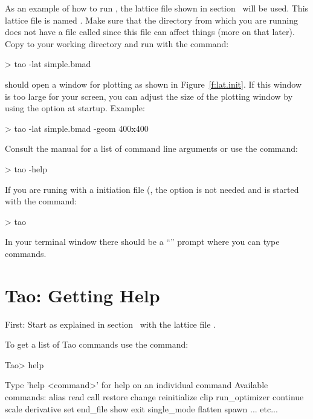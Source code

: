 \documentclass{hitec}
\newcommand{\Section}[1]{\section{#1}\vspace*{-1ex}}
\begin{document}
As an example of how to run \tao, the lattice file shown in section~ will be
used. This lattice file is named .  Make sure that the directory from which you are
running \tao does not have a file called  since this file can affect things (more on
that later). Copy  to your working directory and run \tao with the command:
\begin{code}
> tao -lat simple.bmad
\end{code}
\tao should open a window for plotting as shown in Figure~\ref{f:lat.init}. If this window is too
large for your screen, you can adjust the size of the plotting window by using the 
option at startup. Example:
\begin{code}
> tao -lat simple.bmad -geom 400x400
\end{code}
Consult the \tao manual for a list of command line arguments or use the command:
\begin{code}
> tao -help
\end{code}

If you are runing with a \tao initiation file (, the  option is
not needed and \tao is started with the command:
\begin{code}
> tao
\end{code}

In your terminal window there should be a ``'' prompt where you can type \tao commands.

\newpage

\Section{Tao: Getting Help}

First: Start \tao as explained in section~ with the lattice file
.

To get a list of Tao commands use the  command:
\begin{code}
Tao> help

Type 'help <command>' for help on an individual command
Available commands:
  alias                             read
  call                              restore
  change                            reinitialize
  clip                              run_optimizer
  continue                          scale
  derivative                        set
  end_file                          show
  exit                              single_mode
  flatten                           spawn
... etc...
\end{code}
\end{document}

